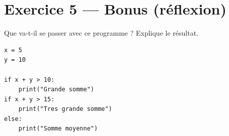 \documentclass[9pt,a4paper]{article}
\begin{document}
\vspace{1cm}

\newpage
\section*{Exercice 5 — Bonus (réflexion)}

\noindent Que va-t-il se passer avec ce programme ? Explique le résultat.

\begin{lstlisting}
x = 5
y = 10

if x + y > 10:
    print("Grande somme")
if x + y > 15:
    print("Tres grande somme")
else:
    print("Somme moyenne")
\end{lstlisting}

\begin{tcolorbox}[colframe=black, colback=white, width=\linewidth]
\vspace{4cm}
\end{tcolorbox}
\end{document}
